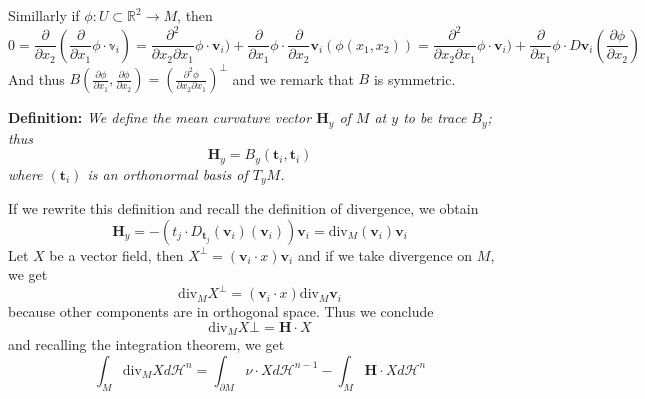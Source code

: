 \vspace{2ex}
Simillarly if $\phi:U\subset\mathbb R^2\rightarrow M$, then
\[0=\frac{\partial}{\partial x_2}(\frac{\partial}{\partial x_1}\phi\cdot\mathbb{v}_i)=
\frac{\partial^2}{\partial x_2\partial x_1}\phi\cdot\mathbf{v}_i)+\frac{\partial}{\partial x_1}\phi\cdot\frac{\partial}{\partial x_2}\mathbf{v}_i(\phi(x_1,x_2))=
\frac{\partial^2}{\partial x_2\partial x_1}\phi\cdot\mathbf{v}_i)+\frac{\partial}{\partial x_1}\phi\cdot D\mathbf{v}_i(\frac{\partial\phi}{\partial x_2})
\]
And thus $B(\frac{\partial\phi}{\partial x_1},\frac{\partial\phi}{\partial x_2})=(\frac{\partial^2\phi}{\partial x_2\partial x_1})^\bot$
and we remark that $B$ is symmetric.

\vspace{2ex}
\textbf{Definition:} \textit{We define the mean curvature vector $\mathbf H_y$
of $M$ at $y$ to be trace $B_y$; thus}
\[\mathbf H_y=B_y(\mathbf t_i,\mathbf t_i)\]
\textit{where $(\mathbf t_i)$ is an orthonormal basis of $T_yM$.}

\vspace{2ex}
If we rewrite this definition and recall the definition of divergence, we obtain
\[\mathbf H_y=-(t_j\cdot D_{\mathbf t_j}(\mathbf v_i)(\mathbf v_i))\mathbf v_i=\text{div}_M(\mathbf v_i)\mathbf v_i\]
Let $X$ be a vector field, then $X^\bot=(\mathbf v_i\cdot x)\mathbf v_i$ and if we take divergence on $M$, we get
\[\text{div}_M X^\bot=(\mathbf v_i\cdot x)\text{div}_M \mathbf v_i\]
because other components are in orthogonal space. Thus we conclude
\[\text{div}_M X\bot=\mathbf H\cdot X\]
and recalling the integration theorem, we get
\[\int_M \text{div}_MXd\mathcal H^n=\int_{\partial M}\nu\cdot Xd\mathcal H^{n-1}-\int_M \mathbf H\cdot Xd\mathcal H^n\]

